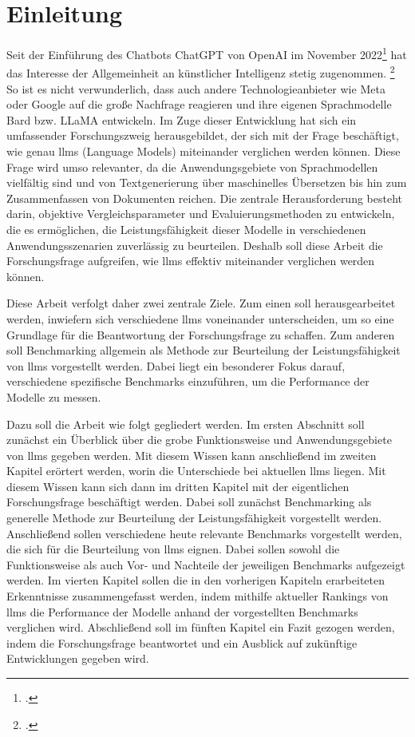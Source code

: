 \section{Einleitung}
Seit der Einführung des Chatbots ChatGPT von OpenAI im November 2022\footcite[Vgl.][]{ChatGPT-announcement} hat das Interesse der Allgemeinheit an künstlicher Intelligenz stetig zugenommen. \footcite[Vgl.][]{google_trends_ki}
So ist es nicht verwunderlich, dass auch andere Technologieanbieter wie Meta oder Google auf die große Nachfrage reagieren und ihre eigenen Sprachmodelle Bard bzw. LLaMA entwickeln.
Im Zuge dieser Entwicklung hat sich ein umfassender Forschungszweig herausgebildet, der sich mit der Frage beschäftigt, wie genau \acp{llm} (Language Models) miteinander verglichen werden können.
Diese Frage wird umso relevanter, da die Anwendungsgebiete von Sprachmodellen vielfältig sind und von Textgenerierung über maschinelles Übersetzen bis hin zum Zusammenfassen von Dokumenten reichen.
Die zentrale Herausforderung besteht darin, objektive Vergleichsparameter und Evaluierungsmethoden zu entwickeln, die es ermöglichen, die Leistungsfähigkeit dieser Modelle in verschiedenen Anwendungsszenarien zuverlässig zu beurteilen.
Deshalb soll diese Arbeit die Forschungsfrage aufgreifen, wie \acp{llm} effektiv miteinander verglichen werden können.

Diese Arbeit verfolgt daher zwei zentrale Ziele. Zum einen soll herausgearbeitet werden, inwiefern sich verschiedene \acp{llm} voneinander unterscheiden, um so eine Grundlage für die Beantwortung der Forschungsfrage zu schaffen.
Zum anderen soll Benchmarking allgemein als Methode zur Beurteilung der Leistungsfähigkeit von \acp{llm} vorgestellt werden.
Dabei liegt ein besonderer Fokus darauf, verschiedene spezifische Benchmarks einzuführen, um die Performance der Modelle zu messen.

Dazu soll die Arbeit wie folgt gegliedert werden.
Im ersten Abschnitt soll zunächst ein Überblick über die grobe Funktionsweise und Anwendungsgebiete von \acp{llm} gegeben werden.
Mit diesem Wissen kann anschließend im zweiten Kapitel erörtert werden, worin die Unterschiede bei aktuellen \acp{llm} liegen.
Mit diesem Wissen kann sich dann im dritten Kapitel mit der eigentlichen Forschungsfrage beschäftigt werden.
Dabei soll zunächst Benchmarking als generelle Methode zur Beurteilung der Leistungsfähigkeit vorgestellt werden.
Anschließend sollen verschiedene heute relevante Benchmarks vorgestellt werden, die sich für die Beurteilung von \acp{llm} eignen.
Dabei sollen sowohl die Funktionsweise als auch Vor- und Nachteile der jeweiligen Benchmarks aufgezeigt werden.
Im vierten Kapitel sollen die in den vorherigen Kapiteln erarbeiteten Erkenntnisse zusammengefasst werden, indem mithilfe aktueller Rankings von \acp{llm} die Performance der Modelle anhand der vorgestellten Benchmarks verglichen wird.
Abschließend soll im fünften Kapitel ein Fazit gezogen werden, indem die Forschungsfrage beantwortet und ein Ausblick auf zukünftige Entwicklungen gegeben wird.

